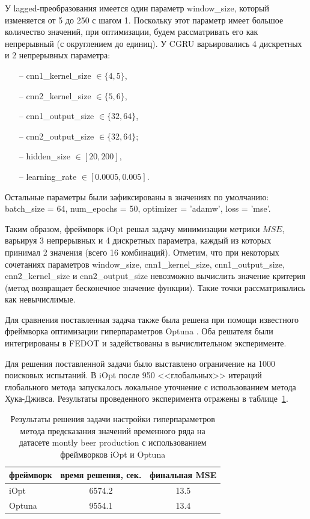 \documentclass[a4paper,12pt,russian]{article}
\begin{document}

У lagged-преобразования имеется один параметр window\_size, который изменяется от 5 до 250 с шагом 1. Поскольку этот параметр имеет большое количество значений, при оптимизации, будем рассматривать его как непрерывный (с округлением до единиц). У CGRU варьировались 4 дискретных и 2 непрерывных параметра:
\begin{itemize}
\item[--] cnn1\_kernel\_size $\in \{4, 5\}$,
\item[--] cnn2\_kernel\_size $\in \{5, 6\}$, 
\item[--] cnn1\_output\_size $\in \{32, 64\}$, 
\item[--] cnn2\_output\_size $\in \{32, 64\}$;
\item[--] hidden\_size $\in [20, 200]$, 
\item[--] learning\_rate $\in [0.0005, 0.005]$.
\end{itemize}
Остальные параметры были зафиксированы в значениях по умолчанию: batch\_size = 64, num\_epochs = 50, optimizer = 'adamw', loss = 'mse'.

Таким образом, фреймворк iOpt решал задачу минимизации метрики $MSE$, варьируя 3 непрерывных и 4 дискретных параметра, каждый из которых принимал 2 значения (всего 16 комбинаций). Отметим, что при некоторых сочетаниях параметров window\_size, cnn1\_kernel\_size, cnn1\_output\_size, cnn2\_kernel\_size и cnn2\_output\_size невозможно вычислить значение критерия (метод возвращает бесконечное значение функции). Такие точки рассматривались как невычислимые.

Для сравнения поставленная задача также была решена при помощи известного фреймворка оптимизации гиперпараметров Optuna%
. Оба решателя были интегрированы в FEDOT и задействованы в вычислительном эксперименте.

Для решения поставленной задачи было выставлено ограничение на 1000 поисковых испытаний. В iOpt после 950 <<глобальных>> итераций глобального метода запускалось локальное уточнение с использованием метода Хука-Дживса. %
Результаты проведенного эксперимента отражены в таблице~\ref{tab1}. 

\begin{table}[h!]
\centering
\caption{Результаты решения задачи настройки гиперпараметров метода предсказания значений временного ряда на датасете montly beer production с использованием фреймворков iOpt и Optuna}\label{tab1}
\begin{tabular}{|l|c|c|}
\hline
фреймворк & время решения, сек. & финальная MSE \\
\hline \hline
iOpt & 6574.2 & 13.5 \\
\hline
Optuna &  9554.1 & 13.4 \\
\hline
\end{tabular}
\end{table}
\end{document}
